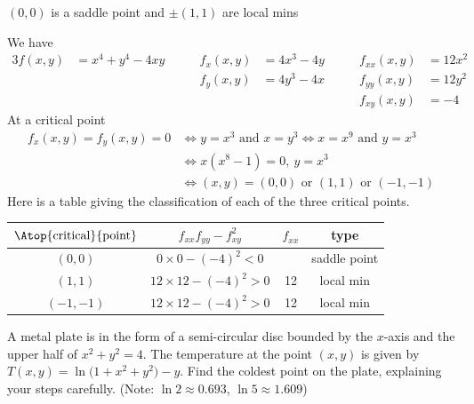 %

\begin{answer}
$(0,0)$ is a saddle point and $\pm(1,1)$ are local mins
\end{answer}

\begin{solution}
We have
\begin{alignat*}{3}
f(x,y)&=x^4+y^4-4xy\qquad &
f_x(x,y)&=4x^3-4y\qquad &
f_{xx}(x,y)&=12x^2\\
 & & f_y(x,y)&=4y^3-4x &
f_{yy}(x,y)&=12y^2 \\
 & & & &f_{xy}(x,y)&=-4
\end{alignat*}
At a critical point
\begin{align*}
f_x(x,y)=f_y(x,y)=0
&\iff y=x^3\text{ and }x=y^3
\iff x=x^9\text{ and }y=x^3 \\
&\iff x(x^8-1)=0,\ y=x^3\\
&\iff (x,y)=(0,0)\text{ or }(1,1)\text{ or }(-1,-1)
\end{align*}
Here is a table giving the classification of each of the three critical
points.
\begin{center}
\renewcommand{\arraystretch}{1.3}
     \begin{tabular}{|c|c|c|c|}
     \hline
    $\Atop{\text{critical}}{\text{point}}$  & $f_{xx}f_{yy}-f_{xy}^2$ & 
                                                          $f_{xx}$ & type \\    
    \hline
     $(0,0)$   & $0\times 0-(-4)^2<0$   &    &saddle point \\ \hline
     $(1,1)$   & $12\times 12-(-4)^2>0$ & 12 & local min \\  \hline
     $(-1,-1)$ & $12\times 12-(-4)^2>0$ & 12 & local min \\  \hline
     \end{tabular}
\renewcommand{\arraystretch}{1.0}
\end{center}
\end{solution}

\begin{question}[M200 2002A] %
A metal plate is in the form of a semi-circular disc bounded
by the $x$-axis and the upper half of $x^2+y^2=4$. The temperature at
the point $(x,y)$ is given by $T(x,y)=\ln\big(1+x^2+y^2\big)-y$. Find the
coldest point on the plate, explaining your steps carefully. (Note: 
$\ln 2\approx 0.693$, $\ln 5\approx 1.609$)
\end{question}

